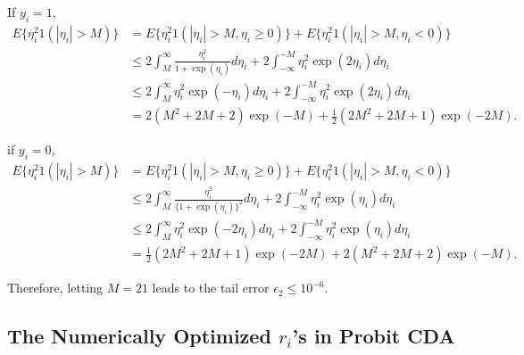 \documentclass[10pt]{article}
\begin{document}
If $y_i=1$,
\begin{equation}
	\begin{aligned}
			E\{ \eta_i^2 1(|\eta_i|>M) \} & = E\{ \eta_i^2 1(|\eta_i|>M, \eta_i \ge 0 ) \} + E\{ \eta_i^2 1(|\eta_i|>M, \eta_i<0 ) \} \\
	& \le 2\int_M^{\infty} \frac{\eta_i^2}{1+\exp(\eta_i)} d\eta_i + 2\int_{-\infty}^{-M}{\eta_i^2}{\exp(2\eta_i)}d\eta_i  \\
	& \le 2\int_M^{\infty} {\eta_i^2}{\exp(-\eta_i)} d\eta_i +2 \int_{-\infty}^{-M}{\eta_i^2}{\exp(2\eta_i)}d\eta_i \\
	& = 2(M^2+2M+2)\exp(-M) + \frac{1}{2} (2M^2 + 2M +1) \exp(-2M).
	\end{aligned}
\end{equation}

if $y_i=0$,
\begin{equation}
	\begin{aligned}
			E\{ \eta_i^2 1(|\eta_i|>M) \} & = E\{ \eta_i^2 1(|\eta_i|>M, \eta_i \ge 0 ) \} + E\{ \eta_i^2 1(|\eta_i|>M, \eta_i<0 ) \} \\
	& \le 2\int_M^{\infty} \frac{\eta_i^2}{\{1+\exp(\eta_i)\}^2} d\eta_i + 2\int_{-\infty}^{-M}{\eta_i^2}{\exp(\eta_i)}d\eta_i  \\
	& \le 2\int_M^{\infty} {\eta_i^2}{\exp(-2\eta_i)} d\eta_i +2 \int_{-\infty}^{-M}{\eta_i^2}{\exp(\eta_i)}d\eta_i \\
	& =\frac{1}{2} (2M^2 + 2M +1) \exp(-2M)+  2(M^2+2M+2)\exp(-M) .
	\end{aligned}
\end{equation}

Therefore, letting $M=21$ leads to the tail error $\epsilon_2\le 10^{-6}$.






\subsection{The Numerically Optimized $r_i$'s in Probit CDA}
\end{document}
